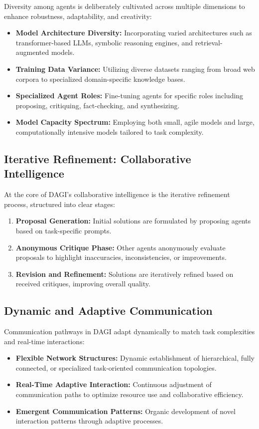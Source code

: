 \documentclass[12pt]{amsart}
\begin{document}
Diversity among agents is deliberately cultivated across multiple dimensions to enhance robustness, adaptability, and creativity:

\begin{itemize}
\item \textbf{Model Architecture Diversity:} Incorporating varied architectures such as transformer-based LLMs, symbolic reasoning engines, and retrieval-augmented models.
\item \textbf{Training Data Variance:} Utilizing diverse datasets ranging from broad web corpora to specialized domain-specific knowledge bases.
\item \textbf{Specialized Agent Roles:} Fine-tuning agents for specific roles including proposing, critiquing, fact-checking, and synthesizing.
\item \textbf{Model Capacity Spectrum:} Employing both small, agile models and large, computationally intensive models tailored to task complexity.
\end{itemize}

\subsection{Iterative Refinement: Collaborative Intelligence}

At the core of DAGI's collaborative intelligence is the iterative refinement process, structured into clear stages:

\begin{enumerate}
\item \textbf{Proposal Generation:} Initial solutions are formulated by proposing agents based on task-specific prompts.
\item \textbf{Anonymous Critique Phase:} Other agents anonymously evaluate proposals to highlight inaccuracies, inconsistencies, or improvements.
\item \textbf{Revision and Refinement:} Solutions are iteratively refined based on received critiques, improving overall quality.
\end{enumerate}

\subsection{Dynamic and Adaptive Communication}

Communication pathways in DAGI adapt dynamically to match task complexities and real-time interactions:

\begin{itemize}
\item \textbf{Flexible Network Structures:} Dynamic establishment of hierarchical, fully connected, or specialized task-oriented communication topologies.
\item \textbf{Real-Time Adaptive Interaction:} Continuous adjustment of communication paths to optimize resource use and collaborative efficiency.
\item \textbf{Emergent Communication Patterns:} Organic development of novel interaction patterns through adaptive processes.
\end{itemize}
\end{document}
